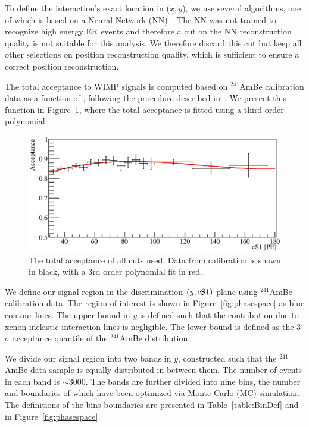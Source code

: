 To define the interaction's exact location in ($x,y$), we use several algorithms, one of which is based on a Neural Network (NN)~\cite{Aprile:2012vw}. The NN was not trained to recognize high energy ER events and therefore a cut on the NN reconstruction quality is not suitable for this analysis. We therefore discard this cut but keep all other selections on position reconstruction quality, which is sufficient to ensure a correct position reconstruction. 

The total acceptance to WIMP signals is computed based on $^{241}$AmBe calibration data as a function of \cSi, following the procedure described in~\cite{Aprile:2012vw}. We present this function in Figure~\ref{fig:Acc}, where the total acceptance is fitted using a third order polynomial.

\begin{figure}[t!]
\begin{minipage}{0.9\linewidth}
\centerline{\includegraphics[width=1.\linewidth]{Figures/Acceptance.eps}}
\end{minipage}
\caption{The total acceptance of all cuts used. Data from calibration is shown in black, with a 3rd order polynomial fit in red.}
\label{fig:Acc}
\end{figure}

We define our signal region in the discrimination $(y,\mathrm{cS1})$-plane using $^{241}$AmBe calibration data. 
The region of interest is shown in Figure~\ref{fig:phasespace} as blue contour lines. The upper bound in $y$ is defined such that the contribution due to xenon inelastic interaction lines is negligible. The lower bound is defined as the 3\,$\sigma$ acceptance quantile of the $^{241}$AmBe distribution.

We divide our signal region into two bands in $y$, constructed such that the $^{241}$AmBe data sample is equally distributed in between them. The number of events in each band is $\sim3000$. The bands are further divided into nine bins, the number and boundaries of which have been optimized via Monte-Carlo (MC) simulation. The definitions of the bins boundaries are presented in Table~\ref{table:BinDef} and in Figure~\ref{fig:phasespace}. 

